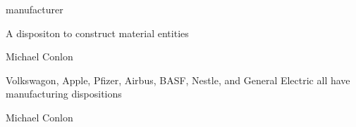 \documentclass[letterpaper,10pt,english]{sphinxmanual}
\begin{document}
\begin{sphinxShadowBox}

\sphinxAtStartPar
manufacturer
\end{sphinxShadowBox}

\begin{sphinxShadowBox}

\sphinxAtStartPar
A dispositon to construct material entities
\end{sphinxShadowBox}

\begin{sphinxShadowBox}

\sphinxAtStartPar
Michael Conlon 
\end{sphinxShadowBox}

\begin{sphinxShadowBox}

\sphinxAtStartPar
Volkswagon, Apple, Pfizer, Airbus, BASF, Nestle, and General Electric all have manufacturing dispositions
\end{sphinxShadowBox}

\begin{sphinxShadowBox}

\sphinxAtStartPar
{}
\end{sphinxShadowBox}

\begin{sphinxShadowBox}

\sphinxAtStartPar
Michael Conlon 
\end{sphinxShadowBox}

\begin{sphinxShadowBox}

\sphinxAtStartPar
{}
\end{sphinxShadowBox}
\begin{quote}

\ignorespaces \end{quote}
\end{document}
